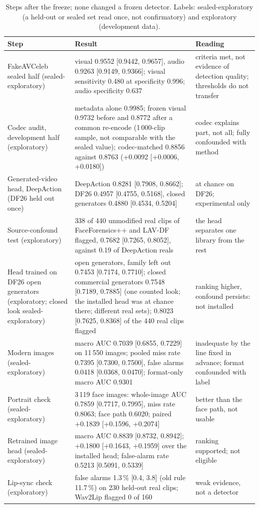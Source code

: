 \documentclass[conference,a4paper]{IEEEtran_nodash}
\begin{document}
\begin{table}[!t]
\centering
\caption[Steps after the freeze]{Steps after the freeze; none changed a frozen
detector. Labels: sealed-exploratory (a held-out or sealed set read once, not
confirmatory) and exploratory (development data).}
\label{tab:post}
\footnotesize
\setlength{\tabcolsep}{3pt}
\begin{tabular}{@{}L{3.3cm} L{8.9cm} L{5.0cm}@{}}
\toprule
Step & Result & Reading \\
\midrule
FakeAVCeleb sealed half (sealed-exploratory) &
visual 0.9552 [0.9442, 0.9657], audio 0.9263 [0.9149, 0.9366]; visual sensitivity 0.480 at specificity 0.996; audio specificity 0.637 &
criteria met, not evidence of detection quality; thresholds do not transfer \\
Codec audit, development half (exploratory) &
metadata alone 0.9985; frozen visual 0.9732 before and 0.8772 after a common re-encode (1\,000-clip sample, not comparable with the sealed value); codec-matched 0.8856 against 0.8763 (+0.0092 [+0.0006, +0.0180]) &
codec explains part, not all; fully confounded with method \\
Generated-video head, DeepAction (DF26 held out once) &
DeepAction 0.8281 [0.7908, 0.8662]; DF26 0.4957 [0.4755, 0.5168], closed generators 0.4880 [0.4534, 0.5204] &
at chance on DF26; experimental only \\
Source-confound test (exploratory) &
338 of 440 unmodified real clips of FaceForensics++ and LAV-DF flagged, 0.7682 [0.7265, 0.8052], against 0.19 of DeepAction reals &
the head separates one library from the rest \\
Head trained on DF26 open generators (exploratory; closed look sealed-exploratory) &
open generators, family left out 0.7453 [0.7174, 0.7710]; closed commercial generators 0.7548 [0.7189, 0.7885] (one counted look; the installed head was at chance there; different real sets); 0.8023 [0.7625, 0.8368] of the 440 real clips flagged &
ranking higher, confound persists: not installed \\
Modern images (sealed-exploratory) &
macro AUC 0.7039 [0.6855, 0.7229] on 11\,550 images; pooled miss rate 0.7395 [0.7300, 0.7500], false alarms 0.0418 [0.0368, 0.0470]; format-only macro AUC 0.9301 &
inadequate by the line fixed in advance; format confounded with label \\
Portrait check (sealed-exploratory) &
3\,119 face images: whole-image AUC 0.7859 [0.7717, 0.7995], miss rate 0.8063; face path 0.6020; paired +0.1839 [+0.1596, +0.2074] &
better than the face path, not usable \\
Retrained image head (sealed-exploratory) &
macro AUC 0.8839 [0.8732, 0.8942]; +0.1800 [+0.1643, +0.1959] over the installed head; false-alarm rate 0.5213 [0.5091, 0.5339] &
ranking supported; not eligible \\
Lip-sync check (exploratory) &
false alarms 1.3\,\% [0.4, 3.8] (old rule 11.7\,\%) on 230 held-out real clips; Wav2Lip flagged 0 of 160 &
weak evidence, not a detector \\
\bottomrule
\end{tabular}
\end{table}
\end{document}
